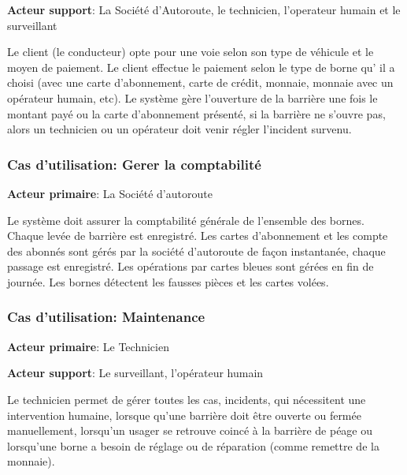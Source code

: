 \textbf{Acteur support}: La Société d’Autoroute, le technicien, l’operateur humain et le surveillant

Le client (le conducteur) opte pour une voie selon son type de véhicule et le moyen de paiement. Le client effectue le paiement selon le type de borne qu’ il a choisi (avec une carte d’abonnement, carte de crédit, monnaie, monnaie avec un opérateur humain, etc). Le système gère l’ouverture de la barrière une fois le montant payé ou la carte d’abonnement présenté, si la barrière ne s’ouvre pas, alors un technicien ou un opérateur doit venir régler l’incident survenu.


\subsubsection{\textbf{Cas d’utilisation:} Gerer la comptabilité}  \label{subsubsec:gerer}
\textbf{Acteur primaire}: La Société d'autoroute 

Le système doit assurer la comptabilité générale de l’ensemble des bornes. Chaque levée de barrière est enregistré. Les cartes d’abonnement et les compte des abonnés sont gérés par la société d’autoroute de façon instantanée, chaque passage est enregistré. Les opérations par cartes bleues sont gérées en fin de journée. Les bornes détectent les fausses pièces et les cartes volées.

\subsubsection{\textbf{Cas d’utilisation:} Maintenance}  \label{subsubsec:maint}
\textbf{Acteur primaire}: Le Technicien 

\textbf{Acteur support}: Le surveillant, l’opérateur humain

Le technicien permet de gérer toutes les cas, incidents, qui nécessitent une intervention humaine, lorsque qu’une barrière doit être ouverte ou fermée manuellement, lorsqu’un usager se retrouve coincé à la barrière de péage ou lorsqu’une borne a besoin de réglage ou de réparation (comme remettre de la monnaie).
